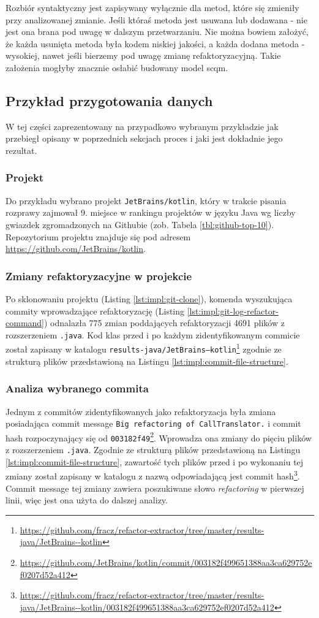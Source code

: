 \documentclass[12pt]{report}
\begin{document}
Rozbiór syntaktyczny jest zapisywany wyłącznie dla metod, które się zmieniły przy analizowanej zmianie. Jeśli któraś metoda jest usuwana lub dodawana - nie jest ona brana pod uwagę w dalszym przetwarzaniu. Nie można bowiem założyć, że każda usunięta metoda była kodem niskiej jakości, a każda dodana metoda - wysokiej, nawet jeśli bierzemy pod uwagę zmianę refaktoryzacyjną. Takie założenia mogłyby znacznie osłabić budowany model \gls{scqm}.

\subsection{Przykład przygotowania danych}
\label{sec:impl:example}
W tej części zaprezentowany na przypadkowo wybranym przykładzie jak przebiegł opisany w poprzednich sekcjach proces i jaki jest dokładnie jego rezultat.

\subsubsection{Projekt}
Do przykładu wybrano projekt \texttt{JetBrains/kotlin}, który w trakcie pisania rozprawy zajmował 9. miejsce w rankingu projektów w języku Java wg liczby gwiazdek zgromadzonych na Githubie (zob. Tabela \ref{tbl:github-top-10}). Repozytorium projektu znajduje się pod adresem \url{https://github.com/JetBrains/kotlin}. 

\subsubsection{Zmiany refaktoryzacyjne w projekcie}
Po sklonowaniu projektu (Listing \ref{lst:impl:git-clone}), komenda wyszukująca commity wprowadzające refaktoryzację (Listing \ref{lst:impl:git-log-refactor-command}) odnalazła 775 zmian poddających refaktoryzacji 4691 plików z rozszerzeniem \texttt{.java}. Kod klas przed i po każdym zidentyfikowanym commicie został zapisany w katalogu \texttt{results-java/JetBrains--kotlin}\footnote{\url{https://github.com/fracz/refactor-extractor/tree/master/results-java/JetBrains--kotlin}} zgodnie ze strukturą plików przedstawioną na Listingu \ref{lst:impl:commit-file-structure}.

\subsubsection{Analiza wybranego commita}
Jednym z commitów zidentyfikowanych jako refaktoryzacja była zmiana posiadająca commit message \texttt{Big refactoring of CallTranslator.} i commit hash rozpoczynający się od \texttt{003182f49}\footnote{\url{https://github.com/JetBrains/kotlin/commit/003182f499651388aa3ca629752ef0207d52a412}}. Wprowadza ona zmiany do pięciu plików z rozszerzeniem \texttt{.java}. Zgodnie ze strukturą plików przedstawioną na Listingu \ref{lst:impl:commit-file-structure}, zawartość tych plików przed i po wykonaniu tej zmiany został zapisany w katalogu z nazwą odpowiadającą jest commit hash\footnote{\url{https://github.com/fracz/refactor-extractor/tree/master/results-java/JetBrains--kotlin/003182f499651388aa3ca629752ef0207d52a412}}. Commit message tej zmiany zawiera poszukiwane słowo \textit{refactoring} w pierwszej linii, więc jest ona użyta do dalszej analizy.
\end{document}
